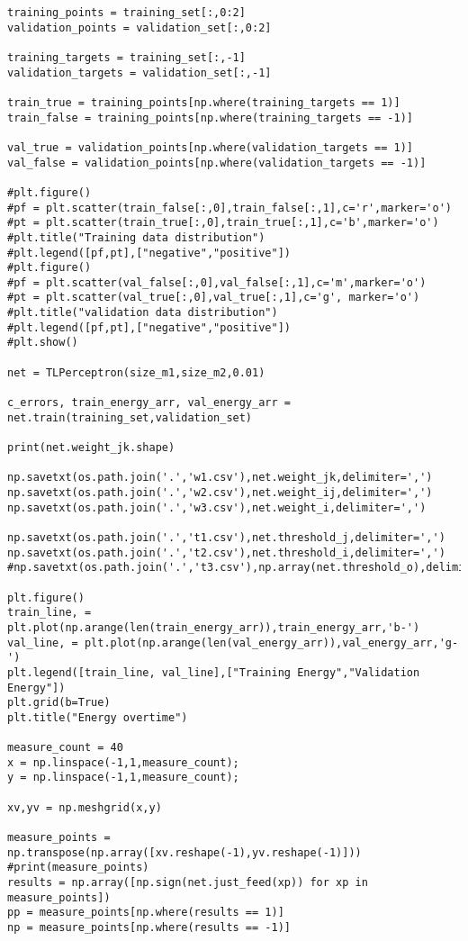 \begin{verbatim}
training_points = training_set[:,0:2]
validation_points = validation_set[:,0:2]

training_targets = training_set[:,-1]
validation_targets = validation_set[:,-1]

train_true = training_points[np.where(training_targets == 1)]
train_false = training_points[np.where(training_targets == -1)]

val_true = validation_points[np.where(validation_targets == 1)]
val_false = validation_points[np.where(validation_targets == -1)]

#plt.figure()
#pf = plt.scatter(train_false[:,0],train_false[:,1],c='r',marker='o')
#pt = plt.scatter(train_true[:,0],train_true[:,1],c='b',marker='o')
#plt.title("Training data distribution")
#plt.legend([pf,pt],["negative","positive"])
#plt.figure()
#pf = plt.scatter(val_false[:,0],val_false[:,1],c='m',marker='o')
#pt = plt.scatter(val_true[:,0],val_true[:,1],c='g', marker='o')
#plt.title("validation data distribution")
#plt.legend([pf,pt],["negative","positive"])
#plt.show()

net = TLPerceptron(size_m1,size_m2,0.01)

c_errors, train_energy_arr, val_energy_arr = net.train(training_set,validation_set)

print(net.weight_jk.shape)

np.savetxt(os.path.join('.','w1.csv'),net.weight_jk,delimiter=',')
np.savetxt(os.path.join('.','w2.csv'),net.weight_ij,delimiter=',')
np.savetxt(os.path.join('.','w3.csv'),net.weight_i,delimiter=',')

np.savetxt(os.path.join('.','t1.csv'),net.threshold_j,delimiter=',')
np.savetxt(os.path.join('.','t2.csv'),net.threshold_i,delimiter=',')
#np.savetxt(os.path.join('.','t3.csv'),np.array(net.threshold_o),delimiter=',')

plt.figure()
train_line, = plt.plot(np.arange(len(train_energy_arr)),train_energy_arr,'b-')
val_line, = plt.plot(np.arange(len(val_energy_arr)),val_energy_arr,'g-')
plt.legend([train_line, val_line],["Training Energy","Validation Energy"])
plt.grid(b=True)
plt.title("Energy overtime")

measure_count = 40
x = np.linspace(-1,1,measure_count);
y = np.linspace(-1,1,measure_count);

xv,yv = np.meshgrid(x,y)

measure_points = np.transpose(np.array([xv.reshape(-1),yv.reshape(-1)])) 
#print(measure_points)
results = np.array([np.sign(net.just_feed(xp)) for xp in measure_points])
pp = measure_points[np.where(results == 1)]
np = measure_points[np.where(results == -1)]


\end{verbatim}
